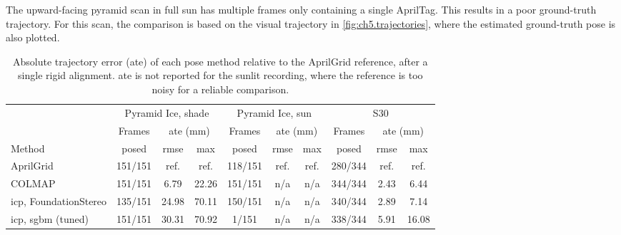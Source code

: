 The upward-facing pyramid scan in full sun has multiple frames only containing a single AprilTag. This results in a poor ground-truth trajectory. For this scan, the comparison
is based on the visual trajectory in \autoref{fig:ch5.trajectories}, where the estimated ground-truth pose is also plotted.



\begin{table}[H]
\centering
\caption{Absolute trajectory error (\acrshort{ate}) of each pose method relative to the
AprilGrid reference, after a single rigid alignment. \acrshort{ate} is not reported for
the sunlit recording, where the reference is too noisy for a reliable
comparison.}
\label{tab:pose_comparison}
\small
\setlength{\tabcolsep}{3pt}
\begin{tabular*}{\textwidth}{@{\extracolsep{\fill}}lccccccccc@{}}
\toprule
 & \multicolumn{3}{c}{Pyramid Ice, shade} & \multicolumn{3}{c}{Pyramid Ice, sun} & \multicolumn{3}{c}{S30} \\
\cmidrule(lr){2-4}\cmidrule(lr){5-7}\cmidrule(lr){8-10}
 & Frames & \multicolumn{2}{c}{\acrshort{ate} (mm)} & Frames & \multicolumn{2}{c}{\acrshort{ate} (mm)} & Frames & \multicolumn{2}{c}{\acrshort{ate} (mm)} \\
Method & posed & \acrshort{rmse} & max & posed & \acrshort{rmse} & max & posed & \acrshort{rmse} & max \\
\midrule
AprilGrid             & 151/151 & ref.  & ref.  & 118/151 & ref. & ref. & 280/344 & ref. & ref.  \\
COLMAP                & 151/151 & 6.79  & 22.26 & 151/151 & n/a   & n/a   & 344/344 & 2.43 & 6.44  \\
\acrshort{icp}, FoundationStereo & 135/151 & 24.98 & 70.11 & 150/151 & n/a   & n/a   & 340/344 & 2.89 & 7.14  \\
\acrshort{icp}, \acrshort{sgbm} (tuned)     & 151/151 & 30.31 & 70.92 & 1/151   & n/a   & n/a   & 338/344 & 5.91 & 16.08 \\
\bottomrule
\end{tabular*}
\end{table}

